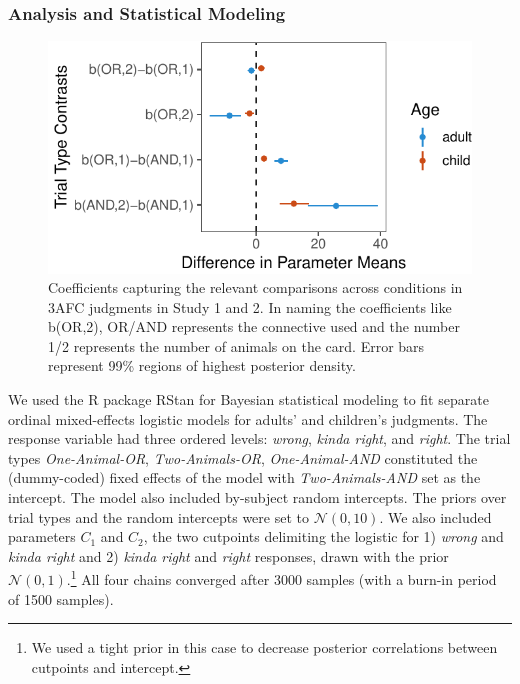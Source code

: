 \documentclass[floatsintext,man]{apa6}
\theoremstyle{definition}
\theoremstyle{definition}
\theoremstyle{definition}
\theoremstyle{remark}
\begin{document}
\subsubsection{Analysis and Statistical
Modeling}\label{analysis-and-statistical-modeling}

\begin{figure}
\centering
\includegraphics{figs/stanModelPlot-1.pdf}
\caption{\label{fig:stanModelPlot}Coefficients capturing the relevant
comparisons across conditions in 3AFC judgments in Study 1 and 2. In
naming the coefficients like b(OR,2), OR/AND represents the connective
used and the number 1/2 represents the number of animals on the card.
Error bars represent 99\% regions of highest posterior density.}
\end{figure}

We used the R package RStan for Bayesian statistical modeling to fit
separate ordinal mixed-effects logistic models for adults' and
children's judgments. The response variable had three ordered levels:
\emph{wrong}, \emph{kinda right}, and \emph{right}. The trial types
\emph{One-Animal-OR}, \emph{Two-Animals-OR}, \emph{One-Animal-AND}
constituted the (dummy-coded) fixed effects of the model with
\emph{Two-Animals-AND} set as the intercept. The model also included
by-subject random intercepts. The priors over trial types and the random
intercepts were set to \(\mathcal{N}(0,10)\). We also included
parameters \(C_1\) and \(C_2\), the two cutpoints delimiting the
logistic for 1) \emph{wrong} and \emph{kinda right} and 2) \emph{kinda
right} and \emph{right} responses, drawn with the prior
\(\mathcal{N}(0,1)\).\footnote{We used a tight prior in this case to
  decrease posterior correlations between cutpoints and intercept.} All
four chains converged after 3000 samples (with a burn-in period of 1500
samples).
\end{document}
